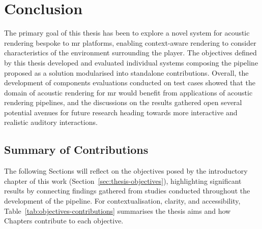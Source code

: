 \chapter{Conclusion}\label{ch:conclusion}
The primary goal of this thesis has been to explore a novel system for acoustic rendering bespoke to \acrshort{mr} platforms, enabling context-aware rendering to consider characteristics of the environment surrounding the player. The objectives defined by this thesis developed and evaluated individual systems composing the pipeline proposed as a solution modularised into standalone contributions. Overall, the development of components evaluations conducted on test cases showed that the domain of acoustic rendering for \acrshort{mr} would benefit from applications of acoustic rendering pipelines, and the discussions on the results gathered open several potential avenues for future research heading towards more interactive and realistic auditory interactions.

\section{Summary of Contributions}
The following Sections will reflect on the objectives posed by the introductory chapter of this work (Section~\ref{sec:thesis-objectives}), highlighting significant results by connecting findings gathered from studies conducted throughout the development of the pipeline. For contextualisation, clarity, and accessibility, Table~\ref{tab:objectives-contributions} summarises the thesis aims and how Chapters contribute to each objective.



